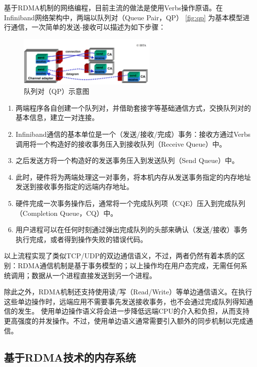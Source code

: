 基于RDMA机制的网络编程，目前主流的做法是使用Verbs操作原语\cite{pfister2001introduction}。在Infiniband网络架构中，两端以队列对（Queue Pair，QP）
\autoref{fig:qp}\cite{pfister2001introduction}
为基本模型进行通信，一次简单的发送-接收可以描述为如下步骤：

\begin{figure}[h]
	\centering
	\includegraphics[width=0.6\textwidth]{image/chap01/qp.png}
	\caption{队列对（QP）示意图}
	\label{fig:qp}
\end{figure}

\begin{enumerate}
	\item 两端程序各自创建一个队列对，并借助套接字等基础通信方式，交换队列对的基本信息，建立一对连接。
	\item Infiniband通信的基本单位是一个（发送/接收/完成）事务：接收方通过Verbs调用将一个构造好的接收事务压入到接收队列（Receive Queue）中。
	\item 之后发送方将一个构造好的发送事务压入到发送队列（Send Queue）中。
	\item 此时，硬件将为两端处理这一对事务，将本机内存从发送事务指定的内存地址发送到接收事务指定的远端内存地址。
	\item 硬件完成一次事务操作后，通常将一个完成队列项（CQE）压入到完成队列（Completion Queue，CQ）中。
	\item 用户进程可以在任何时刻通过弹出完成队列的头部来确认（发送/接收）事务执行完成，或者得到操作失败的错误代码。
\end{enumerate}

以上流程实现了类似TCP/UDP的双边通信语义，不过，两者仍然有着本质的区别：RDMA通信机制是基于事务模型的；以上操作均在用户态完成，无需任何系统调用；数据从一个进程直接发送到另一个进程。

除此之外，RDMA机制还支持使用读/写（Read/Write）等单边通信语义。在执行这些单边操作时，远端应用不需要事先发送接收事务，也不会通过完成队列得知通信的发生。
使用单边操作语义将会进一步降低远端CPU的介入和负担，从而支持更高强度的并发操作。不过，使用单边语义通常需要引入额外的同步机制以完成通信。

\subsection{基于RDMA技术的内存系统}

